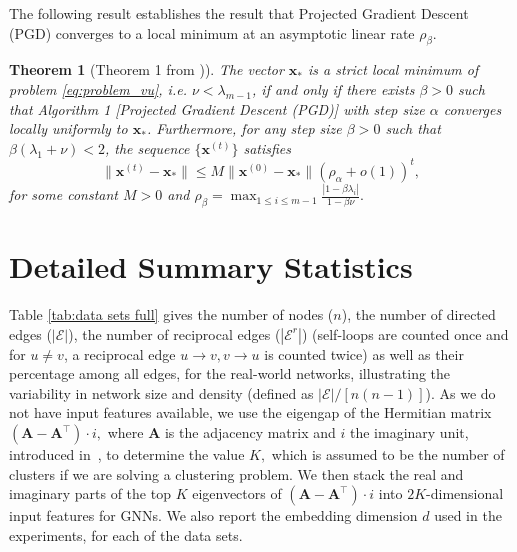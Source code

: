 \documentclass[nohyperref]{article}
\theoremstyle{plain}
\newtheorem{theorem}{Theorem}[section]
\theoremstyle{definition}
\theoremstyle{remark}
\begin{document}
The following result establishes the result that 
Projected Gradient Descent (PGD)  converges to a local minimum at an asymptotic linear rate $\rho_{\beta}$.

\begin{theorem}[Theorem 1 from \cite{vu2019convergence})]
\label{thm:vuThm1}
The vector $\mathbf{x}_{*}$ is a strict local minimum of problem \eqref{eq:problem_vu}, i.e. $ \nu < \lambda_{m-1}$, if and only if there exists $ \beta >0 $ such that Algorithm 1 [Projected Gradient Descent (PGD)] with step size $\alpha$ converges locally uniformly to $\mathbf{x}_{*}$. Furthermore, for any step size $ \beta >0 $  such that $\beta(\lambda_1 + \nu)<2$, the sequence $\{ \mathbf{x}^{(t)} \}$  satisfies
$$
\lVert \mathbf{x}^{(t)} - \mathbf{x}_{*} \rVert 
\leq M \lVert \mathbf{x}^{(0)} - \mathbf{x}_{*} \rVert  \left(  \rho_{\alpha} + o(1) \right)^t,  
$$
for some constant $M>0$ and $\rho_{\beta} = \max_{1 \leq i \leq m-1} \frac{| 1- \beta \lambda_i |}{ 1- \beta \nu }. $ 
\end{theorem}


\section{Detailed Summary Statistics}
\label{appendix_sec:full_data_stats}
Table \ref{tab:data sets full} gives the number of nodes ($n$), the number of directed edges ($|\mathcal{E}|$), the number of reciprocal edges ($|\mathcal{E}^r|$) (self-loops are counted once and for $ u \ne v$, a reciprocal edge $u\rightarrow v, v\rightarrow u$ is counted twice) as well as their percentage among all edges, for the real-world networks, illustrating the variability in network size and density (defined as ${|\mathcal{E}|}/[{n(n-1)}]$). 
As we do not have input features available, we use the eigengap of the Hermitian matrix $(\mathbf{A}-\mathbf{A}^\top)\cdot i,$ where $\mathbf{A}$ is the adjacency matrix and $i$
the imaginary unit, introduced in~\cite{cucuringu2020hermitian}, to determine the value $K,$ which is assumed to be the number of clusters if we are solving a clustering problem.
We then stack the real and imaginary parts of the top $K$ eigenvectors of $(\mathbf{A}-\mathbf{A}^\top)\cdot i$ into $2K$-dimensional input features for GNNs. We also report the embedding dimension $d$ used in the experiments, for each of the data sets.
\end{document}

